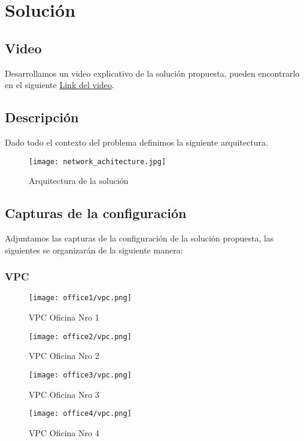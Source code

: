 \section{Solución}

\subsection{Video}
Desarrollamos un video explicativo de la solución propuesta, pueden encontrarlo
en el siguiente \href{https://www.overleaf.com/learn/latex/Inserting_Images}{Link del video}.

\subsection{Descripción}
Dado todo el contexto del problema definimos la siguiente arquitectura.

\begin{figure}[h]
    \centering
    \texttt{[image: network\_achitecture.jpg]}
    \caption{Arquitectura de la solución}
\end{figure}

\subsection{Capturas de la configuración}
Adjuntamos las capturas de la configuración de la solución propuesta,
las siguientes se organizarán de la siguiente manera:

\subsubsection{VPC}
\begin{figure}[h!]
    \centering
    \texttt{[image: office1/vpc.png]}
    \caption{VPC Oficina Nro 1}
\end{figure}
\begin{figure}[h!]
    \centering
    \texttt{[image: office2/vpc.png]}
    \caption{VPC Oficina Nro 2}
\end{figure}
\begin{figure}[h!]
    \centering
    \texttt{[image: office3/vpc.png]}
    \caption{VPC Oficina Nro 3}
\end{figure}
\begin{figure}[h!]
    \centering
    \texttt{[image: office4/vpc.png]}
    \caption{VPC Oficina Nro 4}
\end{figure}


